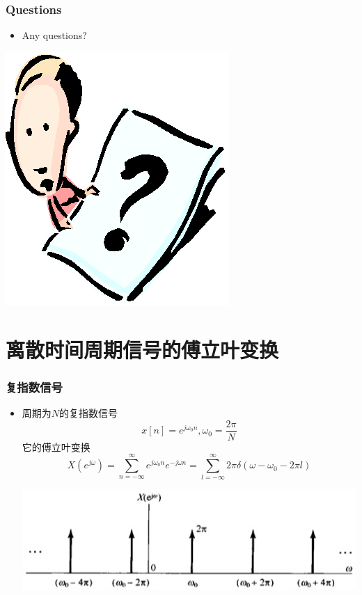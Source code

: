 \documentclass[CJKutf8,dvipsnames,table]{beamer}
\begin{document}
\begin{CJK*}{UTF8}{song}
\begin{frame}
  \end{frame}    
        
  \begin{frame}
    \frametitle{Questions}
    \begin{itemize}
    \item Any questions?
    \end{itemize}
    \begin{center}
      \includegraphics[scale=.5]{question}
    \end{center}
  \end{frame}     
  
  \section{离散时间周期信号的傅立叶变换}

  \begin{frame}
    \frametitle{复指数信号}
    \begin{itemize}
    \item 周期为$N$的复指数信号
    \[
    	x[n]=e^{j\omega_0 n}, \omega_0=\frac{2\pi}{N}
    \]
    它的傅立叶变换
    \[
    	X(e^{j\omega})=\sum_{n=-\infty}^{\infty}e^{j\omega_0 n}e^{-j\omega n}=\sum_{l=-\infty}^{\infty}2\pi \delta(\omega - \omega_0 - 2\pi l)
    \]
    	\begin{center}
    	\includegraphics[scale=.4]{ss-c-f5-8}
    	\end{center}  


\end{itemize}
\end{frame}
\end{CJK*}
\end{document}
